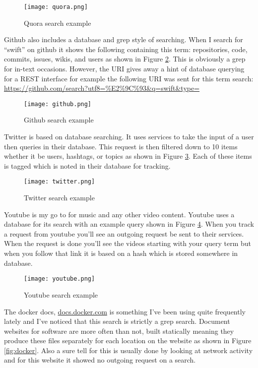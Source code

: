 \documentclass[letterpaper,11pt]{article}
\begin{document}
\begin{figure}[h]
\centering
\texttt{[image: quora.png]}
\caption{Quora search example}
\label{fig:quora}
\end{figure}

Github also includes a database and grep style of searching. When I search for ``swift'' on github it shows the following containing this term: repositories, code, commits, issues, wikis, and users as shown in Figure \ref{fig:github}. This is obviously a grep for in-text occasions. However, the URI gives away a hint of database querying for a REST interface for example the following URI was sent for this term search: \url{https://github.com/search?utf8=%E2%9C%93&q=swift&type=}

\begin{figure}[h]
\centering
\texttt{[image: github.png]}
\caption{Github search example}
\label{fig:github}
\end{figure}

Twitter is based on database searching. It uses services to take the input of a user then queries in their database.
This request is then filtered down to 10 items whether it be users, hashtags, or topics as shown in Figure \ref{fig:twitter}.
Each of these items is tagged which is noted in their database for tracking.

\begin{figure}[h]
\centering
\texttt{[image: twitter.png]}
\caption{Twitter search example}
\label{fig:twitter}
\end{figure}

Youtube is my go to for music and any other video content.
Youtube uses a database for its search with an example query shown in Figure \ref{fig:youtube}.
When you track a request from youtube you'll see an outgoing request be sent to their services.
When the request is done you'll see the videos starting with your query term but when you follow that link it is based on a hash which is stored somewhere in database.

\begin{figure}[h]
\centering
\texttt{[image: youtube.png]}
\caption{Youtube search example}
\label{fig:youtube}
\end{figure}

The docker docs, \url{docs.docker.com} is something I've been using quite frequently lately and I've noticed that this search is strictly a grep search.
Document websites for software are more often than not, built statically meaning they produce these files separately for each location on the website as shown in Figure \ref{fig:docker}.
Also a sure tell for this is usually done by looking at network activity and for this website it showed no outgoing request on a search.
\end{document}
